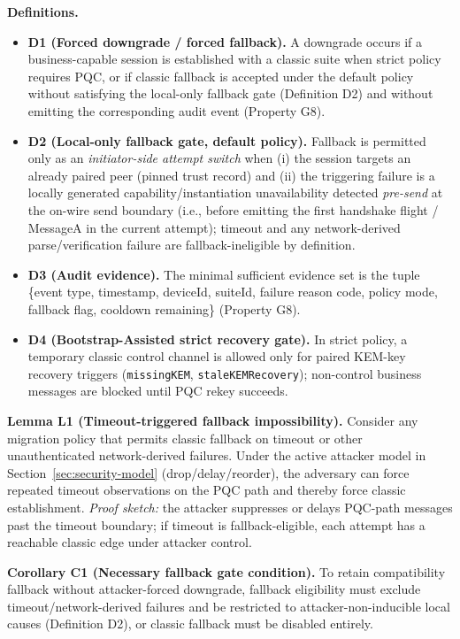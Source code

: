 \documentclass[10pt,journal,compsoc]{IEEEtran}
\providecommand{\tightlist}{%
  \setlength{\itemsep}{0pt}\setlength{\parskip}{0pt}}
\begin{document}
\textbf{Definitions.}
\begin{itemize}\tightlist
\item \textbf{D1 (Forced downgrade / forced fallback).} A downgrade occurs if a business-capable session is established with a classic suite when strict policy requires PQC, or if classic fallback is accepted under the default policy without satisfying the local-only fallback gate (Definition D2) and without emitting the corresponding audit event (Property G8).
\item \textbf{D2 (Local-only fallback gate, default policy).} Fallback is permitted only as an \emph{initiator-side attempt switch} when (i) the session targets an already paired peer (pinned trust record) and (ii) the triggering failure is a locally generated capability/instantiation unavailability detected \emph{pre-send} at the on-wire send boundary (i.e., before emitting the first handshake flight / MessageA in the current attempt); timeout and any network-derived parse/verification failure are fallback-ineligible by definition.
\item \textbf{D3 (Audit evidence).} The minimal sufficient evidence set is the tuple \{event type, timestamp, deviceId, suiteId, failure reason code, policy mode, fallback flag, cooldown remaining\} (Property G8).
\item \textbf{D4 (Bootstrap-Assisted strict recovery gate).} In strict policy, a temporary classic control channel is allowed only for paired KEM-key recovery triggers (\texttt{missingKEM}, \texttt{staleKEMRecovery}); non-control business messages are blocked until PQC rekey succeeds.
\end{itemize}

\textbf{Lemma L1 (Timeout-triggered fallback impossibility).}
Consider any migration policy that permits classic fallback on timeout or
other unauthenticated network-derived failures. Under the active attacker
model in Section~\ref{sec:security-model} (drop/delay/reorder), the
adversary can force repeated timeout observations on the PQC path and
thereby force classic establishment.
\emph{Proof sketch:} the attacker suppresses or delays PQC-path messages
past the timeout boundary; if timeout is fallback-eligible, each attempt
has a reachable classic edge under attacker control.

\textbf{Corollary C1 (Necessary fallback gate condition).}
To retain compatibility fallback without attacker-forced downgrade,
fallback eligibility must exclude timeout/network-derived failures and be
restricted to attacker-non-inducible local causes (Definition D2), or
classic fallback must be disabled entirely.
\end{document}
